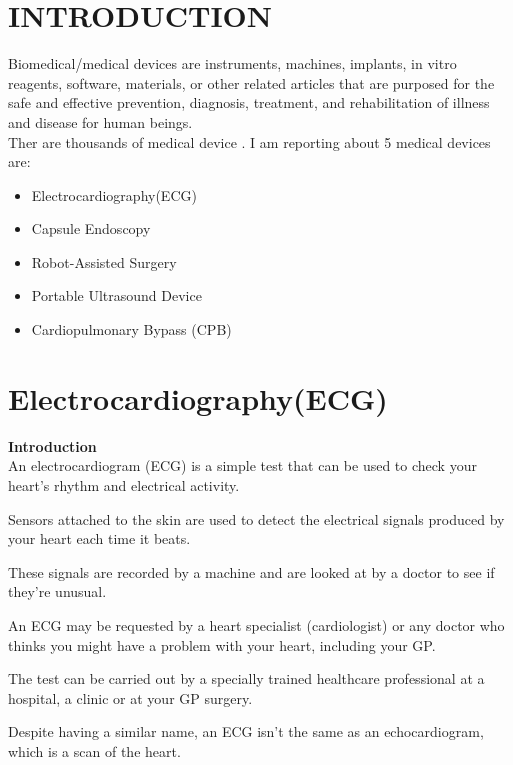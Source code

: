 \documentclass[12pt]{article}
\begin{document}
\section{\LARGE\centering\textbf{INTRODUCTION}}

\large\flushleft Biomedical/medical devices are instruments, machines, implants, in vitro reagents, software, materials, or other related articles that are purposed for the safe and effective prevention, diagnosis, treatment, and rehabilitation of illness and disease for human beings.\\ 

\vspace{1cm}
Ther are thousands of medical device . I am reporting about 5 medical devices are:
\begin{itemize}
\item Electrocardiography(ECG)
\item Capsule Endoscopy
\item Robot-Assisted Surgery
\item Portable Ultrasound Device
\item Cardiopulmonary Bypass (CPB)
\end{itemize}
\pagebreak
 
\section{\centering\huge\textbf{Electrocardiography(ECG)}}


\vspace{0.5cm}

\LARGE\flushleft\textbf{Introduction}\\
\large\flushleft An electrocardiogram (ECG) is a simple test that can be used to check your heart's rhythm and electrical activity.

Sensors attached to the skin are used to detect the electrical signals produced by your heart each time it beats.

These signals are recorded by a machine and are looked at by a doctor to see if they're unusual.

An ECG may be requested by a heart specialist (cardiologist) or any doctor who thinks you might have a problem with your heart, including your GP.

The test can be carried out by a specially trained healthcare professional at a hospital, a clinic or at your GP surgery.

Despite having a similar name, an ECG isn't the same as an echocardiogram, which is a scan of the heart.
\end{document}
